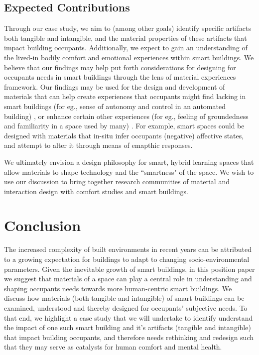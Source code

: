 \documentclass[manuscript, anonymous, review]{acmart}
\begin{document}
\subsection{Expected Contributions}
Through our case study, we aim to (among other goals) identify specific artifacts both tangible and intangible, and the material properties of these artifacts that impact building occupants. Additionally, we expect to gain an understanding of the lived-in bodily comfort and emotional experiences within smart buildings. We believe that our findings may help put forth considerations for designing for occupants needs in smart buildings through the lens of material experiences framework. Our findings may be used for the design and development of materials that can help create experiences that occupants might find lacking in smart buildings (for eg., sense of autonomy and control in an automated building) \cite{moreno2014user}, or enhance certain other experiences (for eg., feeling of groundedness and familiarity in a space used by many) \cite{rehman2022personalisedcomfort}.  For example, smart spaces could be designed with materials that in-situ infer occupants (negative) affective states, and attempt to alter it through means of emapthic responses. 

We ultimately envision a design philosophy for smart, hybrid learning spaces that allow materials to shape technology and the ``smartness" of the space. We wish to use our discussion to bring together research communities of material and interaction design with comfort studies and smart buildings.


\section{Conclusion}
The increased complexity of built environments in recent years can be attributed to a growing expectation for buildings to adapt to changing socio-environmental parameters. Given the inevitable growth of smart buildings, in this position paper we suggest that materials of a space can play a central role in understanding and shaping occupants needs towards more human-centric smart buildings. We discuss how materials (both tangible and intangible) of smart buildings can be examined, understood and thereby designed for occupants' subjective needs. To that end, we highlight a case study that we will undertake to identify understand the impact of one such smart building and it's artifacts (tangible and intangible) that impact building occupants, and therefore needs rethinking and  redesign such that they may serve as catalysts for human comfort and mental health. 




\end{document}
